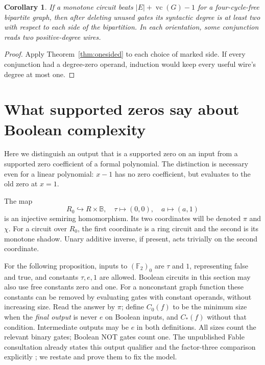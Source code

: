 \documentclass[11pt]{article}
\newcommand{\B}{\mathbb B}
\newcommand{\F}{\mathbb F}
\newcommand{\vc}{\operatorname{vc}}
\newtheorem{corollary}[theorem]{Corollary}
\theoremstyle{definition}
\theoremstyle{remark}
\begin{document}
\begin{corollary}\label{cor:degreewitness}
If a monotone circuit beats $|E|+\vc(G)-1$ for a four-cycle-free bipartite graph, then after deleting unused gates its syntactic degree is at least two with respect to each side of the bipartition. In each orientation, some conjunction reads two positive-degree wires.
\end{corollary}
\begin{proof}
Apply Theorem~\ref{thm:onesided} to each choice of marked side. If every conjunction had a degree-zero operand, induction would keep every useful wire's degree at most one.
\end{proof}

\section{What supported zeros say about Boolean complexity}
Here we distinguish an output that is a supported zero on an input from a supported zero coefficient of a formal polynomial. The distinction is necessary even for a linear polynomial: $x-1$ has no zero coefficient, but evaluates to the old zero at $x=1$.

The map
\[
 R_0\hookrightarrow R\times\B,
 \quad\tau\longmapsto(0,0),\quad a\longmapsto(a,1)
\]
is an injective semiring homomorphism. Its two coordinates will be denoted $\pi$ and $\chi$. For a circuit over $R_0$, the first coordinate is a ring circuit and the second is its monotone shadow. Unary additive inverse, if present, acts trivially on the second coordinate.

For the following proposition, inputs to $(\F_2)_0$ are $\tau$ and $1$, representing false and true, and constants $\tau,e,1$ are allowed. Boolean circuits in this section may also use free constants zero and one. For a nonconstant graph function these constants can be removed by evaluating gates with constant operands, without increasing size. Read the answer by $\pi$; define $C_0(f)$ to be the minimum size when the \emph{final output} is never $e$ on Boolean inputs, and $C_*(f)$ without that condition. Intermediate outputs may be $e$ in both definitions. All sizes count the relevant binary gates; Boolean NOT gates count one. The unpublished Fable consultation already states this output qualifier and the factor-three comparison explicitly \citep[Q2, corollary]{FableConsult}; we restate and prove them to fix the model.
\end{document}
